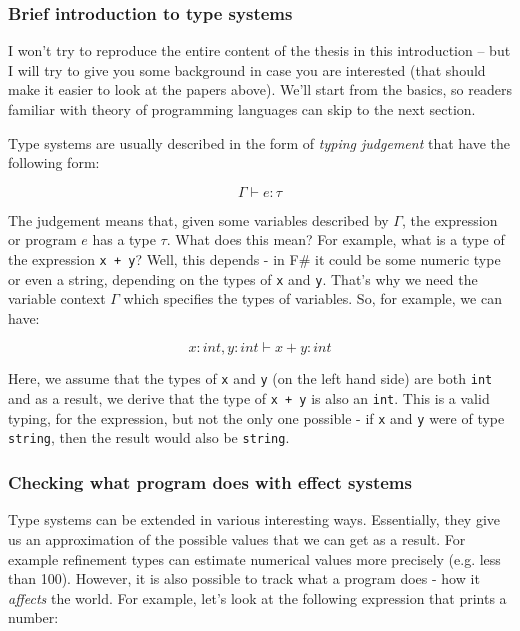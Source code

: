 \subsubsection{Brief introduction to type systems}

I won't try to reproduce the entire content of the thesis in this introduction -- but I will
try to give you some background in case you are interested (that should make it easier to
look at the papers above). We'll start from the basics, so readers familiar with theory of 
programming languages can skip to the next section.

Type systems are usually described in the form of \emph{typing judgement} that have the following form:

\begin{equation}
\Gamma \vdash e : \tau
\end{equation}

The judgement means that, given some variables described by $\Gamma$, the expression or program $e$
has a type $\tau$. What does this mean? For example, what is a type of the expression \texttt{x + y}?
Well, this depends - in F\# it could be some numeric type or even a string, depending on the types
of \texttt{x} and \texttt{y}. That's why we need the variable context $\Gamma$ which specifies the types of variables.
So, for example, we can have:

\begin{equation}
x:int, y:int \vdash x+y : int
\end{equation}

Here, we assume that the types of \texttt{x} and \texttt{y} (on the left hand side) are both \texttt{int} and as a result,
we derive that the type of \texttt{x + y} is also an \texttt{int}. This is a valid typing, for the expression, but
not the only one possible - if \texttt{x} and \texttt{y} were of type \texttt{string}, then the result would also be 
 \texttt{string}.

\subsubsection{Checking what program does with effect systems}

Type systems can be extended in various interesting ways. Essentially, they give us an approximation
of the possible values that we can get as a result. For example refinement types \cite{xx}
can estimate numerical values more precisely (e.g. less than 100). However, it is also possible to 
track what a program does - how it \emph{affects} the world. For example, let's look at the following
expression that prints a number:

